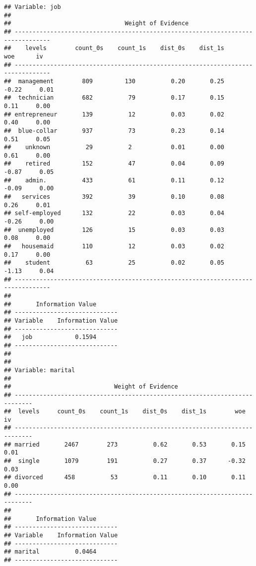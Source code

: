 \documentclass[
]{article}
\begin{document}
\begin{verbatim}
## Variable: job
## 
##                                Weight of Evidence                                
## --------------------------------------------------------------------------------
##    levels        count_0s    count_1s    dist_0s    dist_1s        woe      iv   
## --------------------------------------------------------------------------------
##  management        809         130          0.20       0.25      -0.22     0.01  
##  technician        682          79          0.17       0.15       0.11     0.00  
## entrepreneur       139          12          0.03       0.02       0.40     0.00  
##  blue-collar       937          73          0.23       0.14       0.51     0.05  
##    unknown          29          2           0.01       0.00       0.61     0.00  
##    retired         152          47          0.04       0.09      -0.87     0.05  
##    admin.          433          61          0.11       0.12      -0.09     0.00  
##   services         392          39          0.10       0.08       0.26     0.01  
## self-employed      132          22          0.03       0.04      -0.26     0.00  
##  unemployed        126          15          0.03       0.03       0.08     0.00  
##   housemaid        110          12          0.03       0.02       0.17     0.00  
##    student          63          25          0.02       0.05      -1.13     0.04  
## --------------------------------------------------------------------------------
## 
##       Information Value       
## -----------------------------
## Variable    Information Value 
## -----------------------------
##   job            0.1594       
## -----------------------------
## 
## 
## Variable: marital
## 
##                             Weight of Evidence                              
## ---------------------------------------------------------------------------
##  levels     count_0s    count_1s    dist_0s    dist_1s        woe      iv   
## ---------------------------------------------------------------------------
## married       2467        273          0.62       0.53       0.15     0.01  
##  single       1079        191          0.27       0.37      -0.32     0.03  
## divorced      458          53          0.11       0.10       0.11     0.00  
## ---------------------------------------------------------------------------
## 
##       Information Value       
## -----------------------------
## Variable    Information Value 
## -----------------------------
## marital          0.0464       
## -----------------------------

\end{verbatim}
\end{document}
